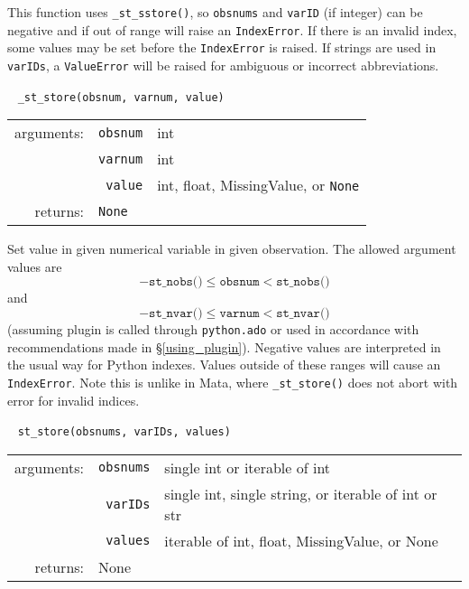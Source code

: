 \documentclass{article}
\begin{document}
			This function uses \lstinline{_st_sstore()}, so \lstinline{obsnums} and \lstinline{varID} (if integer) can be negative and if out of range will raise an \lstinline{IndexError}. If there is an invalid index, some values may be set before the \lstinline{IndexError} is raised. If strings are used in \lstinline{varIDs}, a \lstinline{ValueError} will be raised for ambiguous or incorrect abbreviations. \newline
			
			
			\ \newline
			\noindent \lstinline$_st_store(obsnum, varnum, value)$
								
			\vspace{1.5mm}
			\noindent 
			\indent \begin{tabular}{rrl}
					arguments: & \texttt{obsnum} & int \\
						& \texttt{varnum} & int \\
						& \texttt{value} & int, float, MissingValue, or \texttt{None} \\
					returns: & \multicolumn{2}{l}{\texttt{None}}
				\end{tabular}
								
			\vspace{1.5mm}
			\noindent Set value in given numerical variable in given observation. The allowed argument values are 
			\[
				-\texttt{st\_nobs()} \leq \texttt{obsnum} < \texttt{st\_nobs()}
			\]
			and
			\[
				-\texttt{st\_nvar()} \leq \texttt{varnum} < \texttt{st\_nvar()}
			\]
			(assuming plugin is called through \lstinline$python.ado$ or used in accordance with recommendations made in \S\ref{using_plugin}). Negative values are interpreted in the usual way for Python indexes. Values outside of these ranges will cause an \lstinline$IndexError$. Note this is unlike in Mata, where \lstinline{_st_store()} does not abort with error for invalid indices. \newline
			
			
			\ \newline
			\noindent \lstinline$st_store(obsnums, varIDs, values)$
								
			\vspace{1.5mm}
			\noindent 
			\indent \begin{tabular}{rrl}
					arguments: & \texttt{obsnums} & single int or iterable of int \\
						& \texttt{varIDs} & single int, single string, or iterable of int or str \\
						& \texttt{values} & iterable of int, float, MissingValue, or None \\
					returns: & \multicolumn{2}{l}{None}
				\end{tabular}
								
\end{document}
